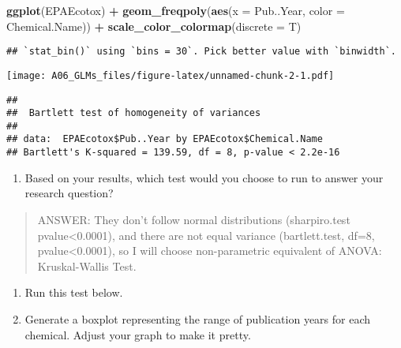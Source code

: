 \documentclass[]{article}
\newenvironment{Shaded}{\begin{snugshade}}{\end{snugshade}}
\newcommand{\KeywordTok}[1]{\textcolor[rgb]{0.13,0.29,0.53}{\textbf{#1}}}
\newcommand{\DataTypeTok}[1]{\textcolor[rgb]{0.13,0.29,0.53}{#1}}
\newcommand{\StringTok}[1]{\textcolor[rgb]{0.31,0.60,0.02}{#1}}
\newcommand{\CommentTok}[1]{\textcolor[rgb]{0.56,0.35,0.01}{\textit{#1}}}
\newcommand{\OperatorTok}[1]{\textcolor[rgb]{0.81,0.36,0.00}{\textbf{#1}}}
\newcommand{\NormalTok}[1]{#1}
\providecommand{\tightlist}{%
  \setlength{\itemsep}{0pt}\setlength{\parskip}{0pt}}
\begin{document}
\begin{Shaded}
\begin{Highlighting}[]
  \KeywordTok{ggplot}\NormalTok{(EPAEcotox) }\OperatorTok{+}
\StringTok{  }\KeywordTok{geom_freqpoly}\NormalTok{(}\KeywordTok{aes}\NormalTok{(}\DataTypeTok{x =}\NormalTok{ Pub..Year, }\DataTypeTok{color =}\NormalTok{ Chemical.Name)) }\OperatorTok{+}
\StringTok{  }\KeywordTok{scale_color_colormap}\NormalTok{(}\DataTypeTok{discrete =}\NormalTok{ T)}
\end{Highlighting}
\end{Shaded}

\begin{verbatim}
## `stat_bin()` using `bins = 30`. Pick better value with `binwidth`.
\end{verbatim}

\texttt{[image: A06\_GLMs\_files/figure-latex/unnamed-chunk-2-1.pdf]}

\begin{Shaded}
\end{Shaded}

\begin{verbatim}
## 
##  Bartlett test of homogeneity of variances
## 
## data:  EPAEcotox$Pub..Year by EPAEcotox$Chemical.Name
## Bartlett's K-squared = 139.59, df = 8, p-value < 2.2e-16
\end{verbatim}

\begin{enumerate}
\def\labelenumi{\arabic{enumi}.}
\setcounter{enumi}{5}
\tightlist
\item
  Based on your results, which test would you choose to run to answer
  your research question?
\end{enumerate}

\begin{quote}
ANSWER: They don't follow normal distributions (sharpiro.test
pvalue\textless{}0.0001), and there are not equal variance
(bartlett.test, df=8, pvalue\textless{}0.0001), so I will choose
non-parametric equivalent of ANOVA: Kruskal-Wallis Test.
\end{quote}

\begin{enumerate}
\def\labelenumi{\arabic{enumi}.}
\setcounter{enumi}{6}
\item
  Run this test below.
\item
  Generate a boxplot representing the range of publication years for
  each chemical. Adjust your graph to make it pretty.
\end{enumerate}
\end{document}
